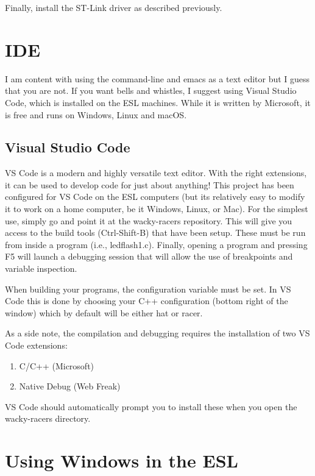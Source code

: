 Finally, install the ST-Link driver as described previously.

\section{IDE}

I am content with using the command-line and emacs as a text editor but I
guess that you are not.  If you want bells and whistles, I suggest using
Visual Studio Code, which is installed on the ESL machines.  While it is
written by Microsoft, it is free and runs on Windows, Linux and macOS.


\subsection{Visual Studio Code}

VS Code is a modern and highly versatile text editor.  With the right
extensions, it can be used to develop code for just about anything!
This project has been configured for VS Code on the ESL computers (but
its relatively easy to modify it to work on a home computer, be it
Windows, Linux, or Mac). For the simplest use, simply go  and point it at the wacky-racers repository.  This will
give you access to the build tools (Ctrl-Shift-B) that have been
setup. These must be run from inside a program (i.e., ledflash1.c).
Finally, opening a program and pressing F5 will launch a debugging
session that will allow the use of breakpoints and variable
inspection.

When building your programs, the  configuration variable
must be set. In VS Code this is done by choosing your C++
configuration (bottom right of the window) which by default will be
either hat or racer.

As a side note, the compilation and debugging requires the
installation of two VS Code extensions:
%
\begin{enumerate}
\item C/C++ (Microsoft)
\item Native Debug (Web Freak)
\end{enumerate}
%
VS Code should automatically prompt you to install these when you open
  the wacky-racers directory.


\section{Using Windows in the ESL} \label{esl-windows}

